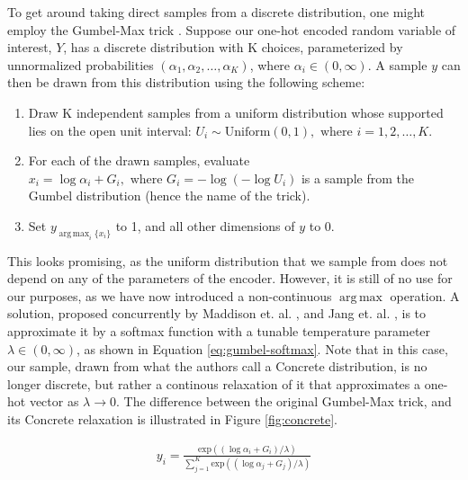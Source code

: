 \documentclass{report}
\DeclareMathOperator*{\argmax}{arg\,max}
\begin{document}
\noindent To get around taking direct samples from a discrete distribution, one might employ the Gumbel-Max trick \cite{Luce59}. Suppose our one-hot encoded random variable of interest, $Y$, has a discrete distribution with K choices, parameterized by unnormalized probabilities $(\alpha_1, \alpha_2, \dots, \alpha_K)$, where $\alpha_i \in (0, \infty)$. A sample $y$ can then be drawn from this distribution using the following scheme:

\begin{enumerate}
  \item Draw K independent samples from a uniform distribution whose supported lies on the open unit interval: $U_i \sim \text{Uniform}(0, 1), \text{ where } i = 1, 2, \dots, K$.
  \item For each of the drawn samples, evaluate $x_i = \log \alpha_i + G_i, \text{ where } G_i = -\log(-\log U_i)$ is a sample from the Gumbel distribution (hence the name of the trick).
  \item Set $y_{\argmax_i \{x_i\}}$ to 1, and all other dimensions of $y$ to 0.
\end{enumerate}

\bigskip

\noindent This looks promising, as the uniform distribution that we sample from does not depend on any of the parameters of the encoder. However, it is still of no use for our purposes, as we have now introduced a non-continuous $\argmax$ operation. A solution, proposed concurrently by Maddison et. al. \cite{concrete}, and Jang et. al. \cite{gumbel-softmax}, is to approximate it by a softmax function with a tunable temperature parameter $\lambda \in (0, \infty)$, as shown in Equation \ref{eq:gumbel-softmax}. Note that in this case, our sample, drawn from what the authors call a Concrete distribution, is no longer discrete, but rather a continous relaxation of it that approximates a one-hot vector as $\lambda \rightarrow 0$. The difference between the original Gumbel-Max trick, and its Concrete relaxation is illustrated in Figure \ref{fig:concrete}.

\begin{equation}
\begin{gathered}
y_i = \frac{\text{exp}((\log \alpha_i + G_i) / \lambda)}{\sum_{j=1}^K \text{exp}((\log \alpha_j + G_j) / \lambda)}
\end{gathered}
\label{eq:gumbel-softmax}
\end{equation}

\bigskip
\end{document}

